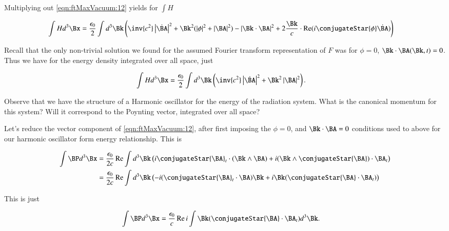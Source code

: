 
Multiplying out \autoref{eqn:ftMaxVacuum:12} yields for $\int H$

\begin{align}
\label{eqn:ftMaxVacuum:14}
\int H d^3 \Bx &=
\frac{\epsilon_0}{2} \int d^3 \Bk \left(
\inv{c^2} \Abs{\dot{\BA}}^2 + \Bk^2 (\Abs{\phi}^2 + \Abs{\BA}^2 )
- \Abs{\Bk \cdot \BA}^2
+ 2 \frac{\Bk}{c} \cdot \Real( i \conjugateStar{\phi} \dot{\BA} )
\right)
\end{align}

Recall that the only non-trivial solution we found for the assumed Fourier transform representation of $F$ was for $\phi = 0$, $\Bk \cdot \BA(\Bk, t) = 0$.  Thus we have for the energy density integrated over all space, just

\begin{align}
\label{eqn:ftMaxVacuum:14b}
\int H d^3 \Bx &=
\frac{\epsilon_0}{2} \int d^3 \Bk \left(
\inv{c^2} \Abs{\dot{\BA}}^2 + \Bk^2 \Abs{\BA}^2 
\right).
\end{align}

Observe that we have the structure of a Harmonic oscillator for the energy of the radiation system.  What is the canonical momentum for this system?  Will it correspond to the Poynting vector, integrated over all space?

Let's reduce the vector component of \autoref{eqn:ftMaxVacuum:12}, after first imposing the $\phi=0$, and $\Bk \cdot \BA = 0$ conditions used to above for our harmonic oscillator form energy relationship.  This is

\begin{align*}
\int \BP d^3 \Bx 
&=
\frac{\epsilon_0}{2 c} \Real 
\int d^3 \Bk \left( 
i \conjugateStar{\BA}_t \cdot (\Bk \wedge \BA)
+ i (\Bk \wedge \conjugateStar{\BA}) \cdot \BA_t
\right) \\
&=
\frac{\epsilon_0}{2 c} \Real 
\int d^3 \Bk \left( 
-i (\conjugateStar{\BA}_t \cdot \BA) \Bk
+ i \Bk (\conjugateStar{\BA} \cdot \BA_t)
\right)
\end{align*}

This is just

\begin{align}
\label{eqn:ftMaxVacuum:15}
\int \BP d^3 \Bx 
&=
\frac{\epsilon_0}{c} \Real 
i \int 
\Bk (\conjugateStar{\BA} \cdot \BA_t) d^3 \Bk.
\end{align}

